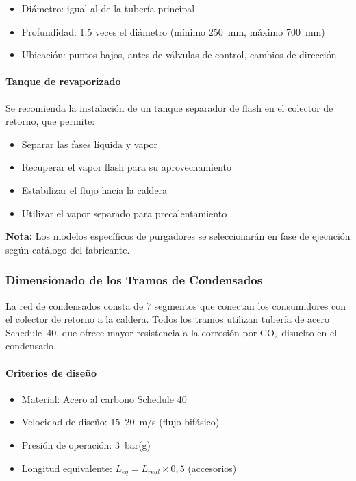 \documentclass[12pt]{article}
\begin{document}
\begin{itemize}[noitemsep]
	\item Diámetro: igual al de la tubería principal
	\item Profundidad: 1{,}5 veces el diámetro (mínimo 250~mm, máximo 700~mm)
	\item Ubicación: puntos bajos, antes de válvulas de control, cambios de dirección
\end{itemize}

\paragraph{Tanque de revaporizado}

Se recomienda la instalación de un tanque separador de flash en el colector de retorno, que permite:

\begin{itemize}[noitemsep]
	\item Separar las fases líquida y vapor
	\item Recuperar el vapor flash para su aprovechamiento
	\item Estabilizar el flujo hacia la caldera
	\item Utilizar el vapor separado para precalentamiento
\end{itemize}

\textbf{Nota:} Los modelos específicos de purgadores se seleccionarán en fase de ejecución según catálogo del fabricante.

\subsubsection{Dimensionado de los Tramos de Condensados}
\label{subsubsec:dimensionado-tramos-condensados}

La red de condensados consta de 7 segmentos que conectan los consumidores con el colector de retorno a la caldera. Todos los tramos utilizan tubería de acero Schedule~40, que ofrece mayor resistencia a la corrosión por CO$_2$ disuelto en el condensado.

\paragraph{Criterios de diseño}

\begin{itemize}[noitemsep]
	\item Material: Acero al carbono Schedule 40
	\item Velocidad de diseño: 15--20~m/s (flujo bifásico)
	\item Presión de operación: 3~bar(g)
	\item Longitud equivalente: $L_{eq} = L_{real} \times 0{,}5$ (accesorios)
\end{itemize}
\end{document}
